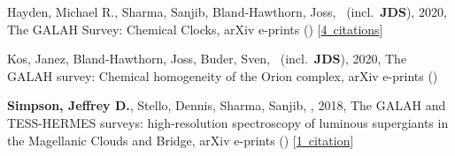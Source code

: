 \item[{\color{numcolor}\scriptsize3}] Hayden, Michael R., Sharma, Sanjib, Bland-Hawthorn, Joss, \etal\ (incl.\ \textbf{JDS}), 2020, The GALAH Survey: Chemical Clocks, arXiv e-prints () [\href{https://ui.adsabs.harvard.edu/#abs/2020arXiv201113745H}{4~citations}]

\item[{\color{numcolor}\scriptsize2}] Kos, Janez, Bland-Hawthorn, Joss, Buder, Sven, \etal\ (incl.\ \textbf{JDS}), 2020, The GALAH survey: Chemical homogeneity of the Orion complex, arXiv e-prints ()

\item[{\color{numcolor}\scriptsize1}] \textbf{Simpson, Jeffrey D.}, Stello, Dennis, Sharma, Sanjib, \etal, 2018, The GALAH and TESS-HERMES surveys: high-resolution spectroscopy of luminous supergiants in the Magellanic Clouds and Bridge, arXiv e-prints () [\href{https://ui.adsabs.harvard.edu/#abs/2018arXiv180405900S}{1~citation}]